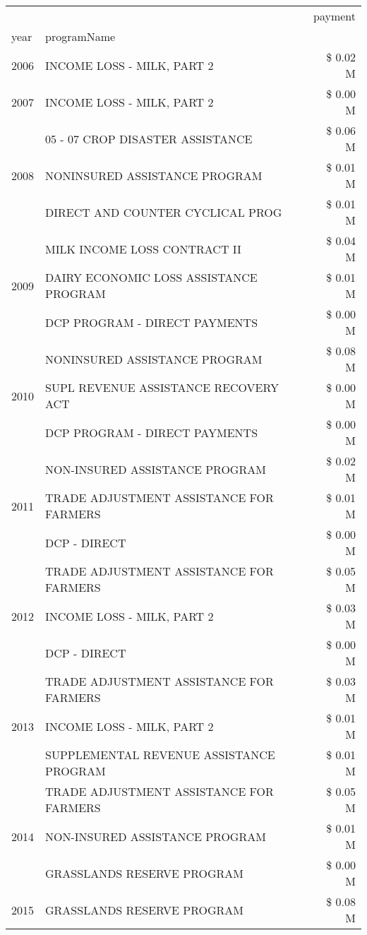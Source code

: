 \begin{tabular}{llr}
\toprule
 &  & payment \\
year & programName &  \\
\midrule
2006 & INCOME LOSS - MILK, PART 2 & \$ 0.02 M \\
\cline{1-3}
2007 & INCOME LOSS - MILK, PART 2 & \$ 0.00 M \\
\cline{1-3}
\multirow[t]{3}{*}{2008} & 05 - 07 CROP DISASTER ASSISTANCE & \$ 0.06 M \\
 & NONINSURED ASSISTANCE PROGRAM & \$ 0.01 M \\
 & DIRECT AND COUNTER CYCLICAL PROG & \$ 0.01 M \\
\cline{1-3}
\multirow[t]{3}{*}{2009} & MILK INCOME LOSS CONTRACT II & \$ 0.04 M \\
 & DAIRY ECONOMIC LOSS ASSISTANCE PROGRAM & \$ 0.01 M \\
 & DCP PROGRAM - DIRECT PAYMENTS & \$ 0.00 M \\
\cline{1-3}
\multirow[t]{3}{*}{2010} & NONINSURED ASSISTANCE PROGRAM & \$ 0.08 M \\
 & SUPL REVENUE ASSISTANCE RECOVERY ACT & \$ 0.00 M \\
 & DCP PROGRAM - DIRECT PAYMENTS & \$ 0.00 M \\
\cline{1-3}
\multirow[t]{3}{*}{2011} & NON-INSURED ASSISTANCE PROGRAM & \$ 0.02 M \\
 & TRADE ADJUSTMENT ASSISTANCE FOR FARMERS & \$ 0.01 M \\
 & DCP - DIRECT & \$ 0.00 M \\
\cline{1-3}
\multirow[t]{3}{*}{2012} & TRADE ADJUSTMENT ASSISTANCE FOR FARMERS & \$ 0.05 M \\
 & INCOME LOSS - MILK, PART 2 & \$ 0.03 M \\
 & DCP - DIRECT & \$ 0.00 M \\
\cline{1-3}
\multirow[t]{3}{*}{2013} & TRADE ADJUSTMENT ASSISTANCE FOR FARMERS & \$ 0.03 M \\
 & INCOME LOSS - MILK, PART 2 & \$ 0.01 M \\
 & SUPPLEMENTAL REVENUE ASSISTANCE PROGRAM & \$ 0.01 M \\
\cline{1-3}
\multirow[t]{3}{*}{2014} & TRADE ADJUSTMENT ASSISTANCE FOR FARMERS & \$ 0.05 M \\
 & NON-INSURED ASSISTANCE PROGRAM & \$ 0.01 M \\
 & GRASSLANDS RESERVE PROGRAM & \$ 0.00 M \\
\cline{1-3}
\multirow[t]{3}{*}{2015} & GRASSLANDS RESERVE PROGRAM & \$ 0.08 M \\

\end{tabular}
